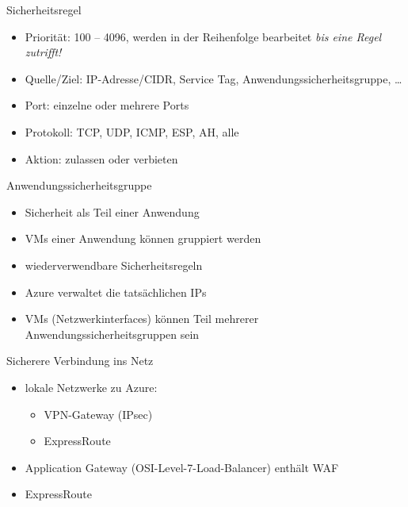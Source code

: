 \begin{flashcard}[]{Sicherheitsregel}
  \begin{itemize}
    \item Priorität: 100 -- 4096, werden in der Reihenfolge bearbeitet \emph{bis eine Regel zutrifft!}
    \item Quelle/Ziel: IP-Adresse/CIDR, Service Tag, Anwendungssicherheitsgruppe, \ldots
    \item Port: einzelne oder mehrere Ports
    \item Protokoll: TCP, UDP, ICMP, ESP, AH, alle
    \item Aktion: zulassen oder verbieten
  \end{itemize}
\end{flashcard}

\begin{flashcard}[]{Anwendungssicherheitsgruppe}
  \begin{itemize}
    \item Sicherheit als Teil einer Anwendung
    \item VMs einer Anwendung können gruppiert werden
    \item wiederverwendbare Sicherheitsregeln
    \item[!] Azure verwaltet die tatsächlichen IPs
    \item VMs (Netzwerkinterfaces) können Teil mehrerer Anwendungssicherheitsgruppen sein
  \end{itemize}
\end{flashcard}

\begin{flashcard}[]{Sicherere Verbindung ins Netz}
  \begin{itemize}
    \item lokale Netzwerke zu Azure:
      \begin{itemize}
        \item VPN-Gateway (IPsec)
        \item ExpressRoute
      \end{itemize}
    \item Application Gateway (OSI-Level-7-Load-Balancer) enthält WAF
    \item ExpressRoute 
  \end{itemize}
\end{flashcard}

